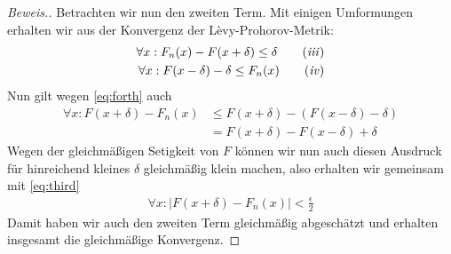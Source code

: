 \begin{proof}[Beweis.]
Betrachten wir nun den zweiten Term. Mit einigen Umformungen erhalten wir aus der Konvergenz der Lèvy-Prohorov-Metrik:
\begin{align*}
 \forall x: F_n(x)- F(x+\delta)\leq \delta \tag{\textit{iii}} \label{eq:third} \\
 \forall x: F(x-\delta)-\delta\leq F_n(x)\tag{\textit{iv}} \label{eq:forth} \\
\end{align*}
Nun gilt wegen \eqref{eq:forth} auch
\begin{align*}
  \forall x: F(x+\delta)-F_n(x)&\leq F(x+\delta)-(F(x-\delta)-\delta)\\
  &=F(x+\delta)-F(x-\delta)+\delta
\end{align*}
Wegen der gleichmäßigen Setigkeit von $F$ können wir nun auch diesen Ausdruck für hinreichend kleines $\delta$ gleichmäßig klein machen, also erhalten wir gemeinsam mit \eqref{eq:third}
\begin{align*}
  \forall x:\vert F(x+\delta)-F_n(x)\vert<\frac{\epsilon}{2}
\end{align*}
Damit haben wir auch den zweiten Term gleichmäßig abgeschätzt und erhalten insgesamt die gleichmäßige Konvergenz.
\end{proof}
